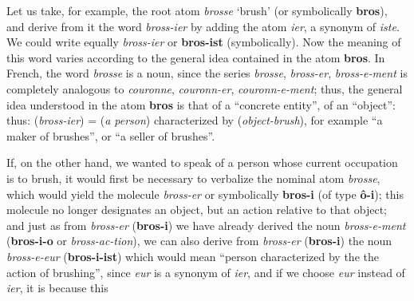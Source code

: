 \begin{sloppypar}
{{    Let us take, for example, the root atom \emph{brosse} `brush' (or
    symbolically \textbf{bros}), and derive from it the word
    \emph{bross-ier} by adding the atom \emph{ier}, a synonym of
    \emph{iste}. We could write equally \emph{bross-ier} or
    \textbf{bros-ist} (symbolically). Now the meaning of this word
    varies according to the general idea contained in the atom
    \textbf{bros}. In French, the word \emph{brosse} is a noun, since
    the series \emph{brosse}, \emph{bross-er}, \emph{bross-e-ment} is
    completely analogous to \emph{couronne}, \emph{couronn-er},
    \emph{couronn-e-ment}; thus, the general idea understood in the
    atom \textbf{bros} is that of a ``concrete entity'', of an
    ``object'': thus: (\emph{bross-ier}) = (\emph{a person})
    characterized by (\emph{object-brush}), for example ``a maker of
    brushes'', or ``a seller of brushes''.

    If, on the other hand, we wanted to speak of a person whose
    current occupation is to brush, it would first be necessary to
    verbalize the nominal atom \emph{brosse}, which would yield the
    molecule \emph{bross-er} or symbolically \textbf{bros-i} (of type
    \textbf{ô-i}); this molecule no longer designates an object, but
    an action relative to that object; and just as from \emph{bross-er}
    (\textbf{bros-i}) we have already derived the noun
    \emph{bross-e-ment} (\textbf{bros-i-o} or \emph{bross-ac-tion}), we
    can also derive from \emph{bross-er} (\textbf{bros-i}) the noun
    \emph{bross-e-eur} (\textbf{bros-i-ist}) which would mean ``person
    characterized by the the action of brushing'', since \emph{eur} is a
    synonym of \emph{ier}, and if we choose \emph{eur} instead of \emph{ier},
    it is because this



  }

}

\end{sloppypar}
